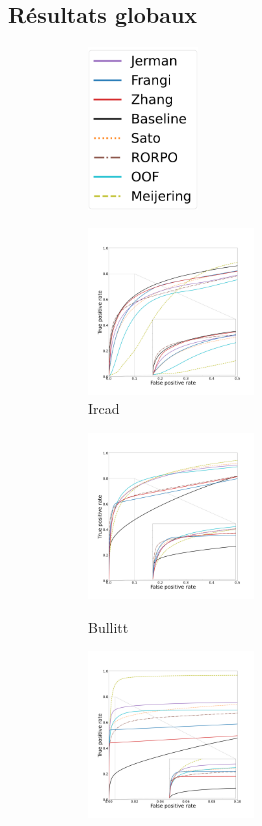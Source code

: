 \subsection{Résultats globaux}

\begin{figure}[!ht]
  \centering
  \begin{subfigure}[t]{0.4\textwidth}
    \includegraphics[clip = true, height=43mm]{Images/standAloneLegend.pdf}
  \end{subfigure}
  \begin{subfigure}[t]{0.4\textwidth}
  \includegraphics[clip = true, trim  =  125 125 180 260, width=44mm]{Images/Ircad_ROC.pdf}
  \caption{Ircad}
\end{subfigure}
  \begin{subfigure}[t]{0.4\textwidth}
  \includegraphics[clip = true, trim  =  125 125 180 200, width=44mm]{Images/Bullitt_ROC.pdf} \\
  \caption{Bullitt}
\end{subfigure}
  \begin{subfigure}[t]{0.4\textwidth}
  \includegraphics[clip = true, trim  =  125 125 100 200, width=44mm]{Images/Vascu_2_ROC.pdf}

\end{subfigure}
\end{figure}
